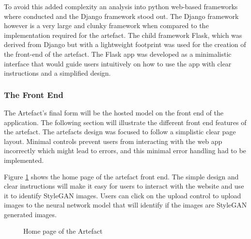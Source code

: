 To avoid this added complexity an analysis into python web-based frameworks where conducted and the Django framework stood out. The Django framework however is a very large and clunky framework when compared to the implementation required for the artefact. The child framework Flask, which was derived from Django but with a lightweight footprint was used for the creation of the front-end of the artefact. The Flask app was developed as a minimalistic interface that would guide users intuitively on how to use the app with clear instructions and a simplified design. 

\subsubsection{The Front End}

The Artefact's final form will be the hosted model on the front end of the application. The following section will illustrate the different front end features of the artefact. The artefacts design was focused to follow a simplistic clear page layout. Minimal controls prevent users from interacting with the web app incorrectly which might lead to errors, and this minimal error handling had to be implemented.

Figure \ref{fig:home} shows the home page of the artefact front end. The simple design and clear instructions will make it easy for users to interact with the website and use it to identify StyleGAN images. Users can click on the upload control to upload images to the neural network model that will identify if the images are StyleGAN generated images. 

\begin{figure}[H]%
\centering
{}%
\caption{Home page of the Artefact}%
\label{fig:home}%
\end{figure}

